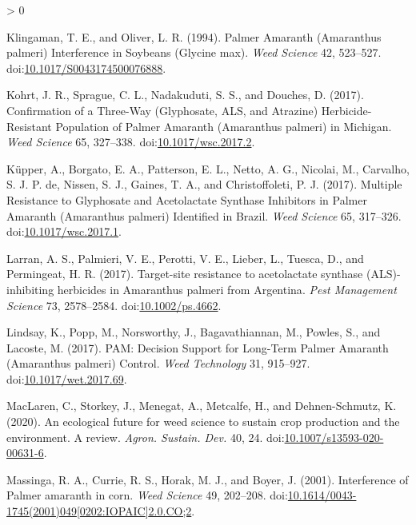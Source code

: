 \documentclass[utf8]{frontiersSCNS}
\newlength{\cslhangindent}
\newenvironment{CSLReferences}[2] %
 {%
  \setlength{\parindent}{0pt}
  \ifodd #1 \everypar{\setlength{\hangindent}{\cslhangindent}}\ignorespaces\fi
  \ifnum #2 > 0
  \setlength{\parskip}{#2\baselineskip}
  \fi
 }%
 {}
\begin{document}
\begin{CSLReferences}{1}{0}
\leavevmode\hypertarget{ref-klingaman1994}{}%
Klingaman, T. E., and Oliver, L. R. (1994). Palmer {Amaranth}
({Amaranthus} palmeri) {Interference} in {Soybeans} ({Glycine} max).
\emph{Weed Science} 42, 523--527.
doi:\href{https://doi.org/10.1017/S0043174500076888}{10.1017/S0043174500076888}.

\leavevmode\hypertarget{ref-kohrt2017}{}%
Kohrt, J. R., Sprague, C. L., Nadakuduti, S. S., and Douches, D. (2017).
Confirmation of a {Three}-{Way} ({Glyphosate}, {ALS}, and {Atrazine})
{Herbicide}-{Resistant Population} of {Palmer Amaranth} ({Amaranthus}
palmeri) in {Michigan}. \emph{Weed Science} 65, 327--338.
doi:\href{https://doi.org/10.1017/wsc.2017.2}{10.1017/wsc.2017.2}.

\leavevmode\hypertarget{ref-kupper2017}{}%
Küpper, A., Borgato, E. A., Patterson, E. L., Netto, A. G., Nicolai, M.,
Carvalho, S. J. P. de, Nissen, S. J., Gaines, T. A., and Christoffoleti,
P. J. (2017). Multiple {Resistance} to {Glyphosate} and {Acetolactate
Synthase Inhibitors} in {Palmer Amaranth} ({Amaranthus} palmeri)
{Identified} in {Brazil}. \emph{Weed Science} 65, 317--326.
doi:\href{https://doi.org/10.1017/wsc.2017.1}{10.1017/wsc.2017.1}.

\leavevmode\hypertarget{ref-larran2017}{}%
Larran, A. S., Palmieri, V. E., Perotti, V. E., Lieber, L., Tuesca, D.,
and Permingeat, H. R. (2017). Target-site resistance to acetolactate
synthase ({ALS})-inhibiting herbicides in {Amaranthus} palmeri from
{Argentina}. \emph{Pest Management Science} 73, 2578--2584.
doi:\href{https://doi.org/10.1002/ps.4662}{10.1002/ps.4662}.

\leavevmode\hypertarget{ref-lindsay2017}{}%
Lindsay, K., Popp, M., Norsworthy, J., Bagavathiannan, M., Powles, S.,
and Lacoste, M. (2017). {PAM}: {Decision Support} for {Long}-{Term
Palmer Amaranth} ({Amaranthus} palmeri) {Control}. \emph{Weed
Technology} 31, 915--927.
doi:\href{https://doi.org/10.1017/wet.2017.69}{10.1017/wet.2017.69}.

\leavevmode\hypertarget{ref-maclaren2020}{}%
MacLaren, C., Storkey, J., Menegat, A., Metcalfe, H., and
Dehnen-Schmutz, K. (2020). An ecological future for weed science to
sustain crop production and the environment. {A} review. \emph{Agron.
Sustain. Dev.} 40, 24.
doi:\href{https://doi.org/10.1007/s13593-020-00631-6}{10.1007/s13593-020-00631-6}.

\leavevmode\hypertarget{ref-massinga2001}{}%
Massinga, R. A., Currie, R. S., Horak, M. J., and Boyer, J. (2001).
Interference of {Palmer} amaranth in corn. \emph{Weed Science} 49,
202--208.
doi:\href{https://doi.org/10.1614/0043-1745(2001)049\%5B0202:IOPAIC\%5D2.0.CO;2}{10.1614/0043-1745(2001)049{[}0202:IOPAIC{]}2.0.CO;2}.


\end{CSLReferences}
\end{document}
